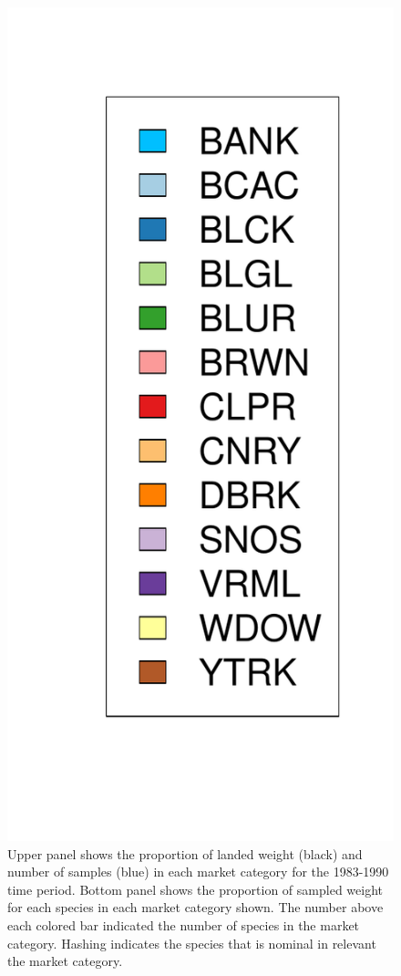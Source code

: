 \documentclass[12pt]{article}
\begin{document}
\begin{landscape}
\begin{figure}[h!]
\includegraphics[height=0.8\textheight]{./pictures/barplotLegend.pdf}
\caption{Upper panel shows the proportion of landed weight (black) and number of                 
samples (blue) in each market category for the 1983-1990 time period. Bottom panel 
shows the proportion of sampled weight for each species in each market category 
shown. The number above each colored bar indicated the number of species in 
the market category. Hashing indicates the species that is nominal in relevant 
the market category.}
\label{bar83}
\end{figure}
\end{landscape}
\end{document}
